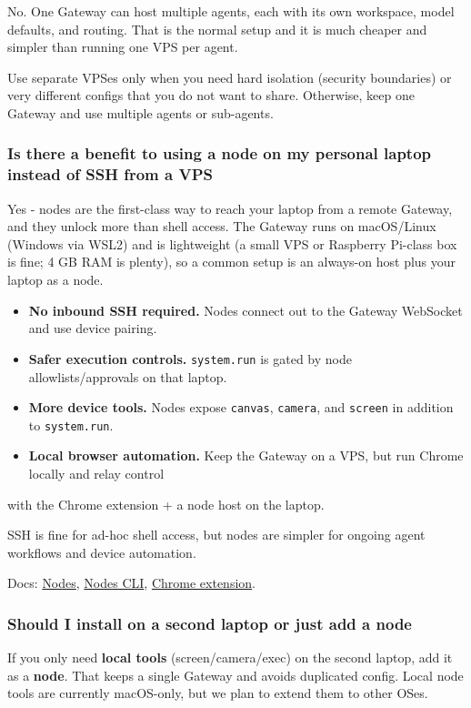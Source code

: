 No. One Gateway can host multiple agents, each with its own workspace, model defaults,
and routing. That is the normal setup and it is much cheaper and simpler than running
one VPS per agent.

Use separate VPSes only when you need hard isolation (security boundaries) or very
different configs that you do not want to share. Otherwise, keep one Gateway and
use multiple agents or sub-agents.

\subsubsection{Is there a benefit to using a node on my personal laptop instead of SSH from a VPS}


Yes - nodes are the first-class way to reach your laptop from a remote Gateway, and they
unlock more than shell access. The Gateway runs on macOS/Linux (Windows via WSL2) and is
lightweight (a small VPS or Raspberry Pi-class box is fine; 4 GB RAM is plenty), so a common
setup is an always-on host plus your laptop as a node.

\begin{itemize}
  \item \textbf{No inbound SSH required.} Nodes connect out to the Gateway WebSocket and use device pairing.
  \item \textbf{Safer execution controls.} \texttt{system.run} is gated by node allowlists/approvals on that laptop.
  \item \textbf{More device tools.} Nodes expose \texttt{canvas}, \texttt{camera}, and \texttt{screen} in addition to \texttt{system.run}.
  \item \textbf{Local browser automation.} Keep the Gateway on a VPS, but run Chrome locally and relay control
\end{itemize}

with the Chrome extension + a node host on the laptop.

SSH is fine for ad-hoc shell access, but nodes are simpler for ongoing agent workflows and
device automation.

Docs: \href{/nodes}{Nodes}, \href{/cli/nodes}{Nodes CLI}, \href{/tools/chrome-extension}{Chrome extension}.

\subsubsection{Should I install on a second laptop or just add a node}


If you only need \textbf{local tools} (screen/camera/exec) on the second laptop, add it as a
\textbf{node}. That keeps a single Gateway and avoids duplicated config. Local node tools are
currently macOS-only, but we plan to extend them to other OSes.

